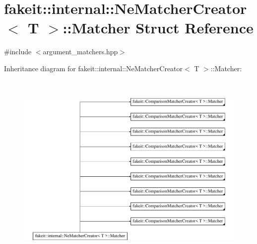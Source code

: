 \hypertarget{structfakeit_1_1internal_1_1NeMatcherCreator_1_1Matcher}{}\section{fakeit\+::internal\+::Ne\+Matcher\+Creator$<$ T $>$\+::Matcher Struct Reference}
\label{structfakeit_1_1internal_1_1NeMatcherCreator_1_1Matcher}


{\ttfamily \#include $<$argument\+\_\+matchers.\+hpp$>$}

Inheritance diagram for fakeit\+::internal\+::Ne\+Matcher\+Creator$<$ T $>$\+::Matcher\+:\begin{figure}[H]
\begin{center}
\leavevmode
\includegraphics[height=9.427609cm]{structfakeit_1_1internal_1_1NeMatcherCreator_1_1Matcher}
\end{center}
\end{figure}

